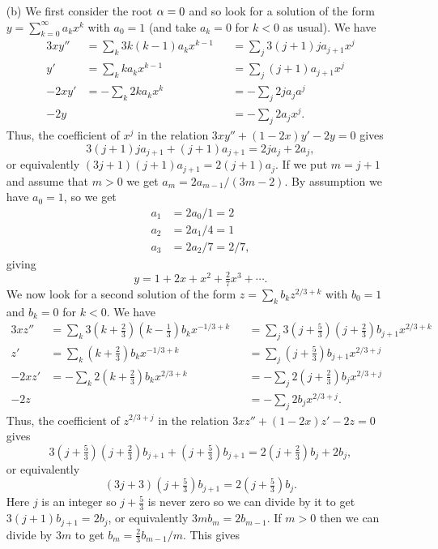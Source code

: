 \documentclass[a4paper]{amsart}
\begin{document}
\begin{solution}
\begin{itemize}
  \item[(b)]
   We first consider the root $\alpha=0$ and so look for a solution of the
   form $y=\sum_{k=0}^\infty a_kx^k$ with $a_0=1$ (and take $a_k=0$ for
   $k<0$ as usual).  We have
   \begin{align*}
    3xy'' &= \sum_k3k(k-1)a_kx^{k-1} 
          &&= \sum_j3(j+1)ja_{j+1}x^j \\
    y' &= \sum_k ka_kx^{k-1}
       &&= \sum_j (j+1)a_{j+1}x^j \\
    -2xy' &= - \sum_k 2ka_kx^k 
          &&= -\sum_j 2ja_ja^j \\
    -2y &&&= -\sum_j 2a_jx^j.
   \end{align*}
   Thus, the coefficient of $x^j$ in the relation $3xy''+(1-2x)y'-2y=0$
   gives 
   \[ 3(j+1)ja_{j+1} + (j+1)a_{j+1} = 2ja_j+2a_j, \]
   or equivalently $(3j+1)(j+1)a_{j+1}=2(j+1)a_j$.  If we put $m=j+1$
   and assume that $m>0$ we get $a_m=2a_{m-1}/(3m-2)$.  By assumption we
   have $a_0=1$, so we get
   \begin{align*}
    a_1 &= 2a_0/1 = 2 \\
    a_2 &= 2a_1/4 = 1 \\
    a_3 &= 2a_2/7 = 2/7,
   \end{align*}
   giving 
   \[ y = 1 + 2x + x^2 + \tfrac{2}{7}x^3 + \dotsb. \]
   We now look for a second solution of the form $z=\sum_kb_kz^{2/3+k}$
   with $b_0=1$ and $b_k=0$ for $k<0$.  We have
   \begin{align*}
    3xz'' &= \sum_k 3(k+\tfrac{2}{3})(k-\tfrac{1}{3})b_kx^{-1/3+k} 
         &&= \sum_j 3(j+\tfrac{5}{3})(j+\tfrac{2}{3})b_{j+1}x^{2/3+k} \\
    z'    &= \sum_k (k+\tfrac{2}{3})b_kx^{-1/3+k}
         &&= \sum_j (j+\tfrac{5}{3})b_{j+1}x^{2/3+j} \\
    -2xz' &= -\sum_k 2(k+\tfrac{2}{3})b_kx^{2/3+k}
         &&= -\sum_j 2(j+\tfrac{2}{3})b_jx^{2/3+j} \\
    -2z &&&= -\sum_j 2b_j x^{2/3+j}.
   \end{align*}
   Thus, the coefficient of $z^{2/3+j}$ in the relation
   $3xz''+(1-2x)z'-2z=0$ gives
   \[ 3(j+\tfrac{5}{3})(j+\tfrac{2}{3})b_{j+1} + 
      (j+\tfrac{5}{3})b_{j+1} = 
      2(j+\tfrac{2}{3})b_j + 2b_j,
   \]
   or equivalently 
   \[ (3j+3)(j+\tfrac{5}{3})b_{j+1} = 2(j+\tfrac{5}{3})b_j. \]
   Here $j$ is an integer so $j+\tfrac{5}{3}$ is never zero so we can
   divide by it to get $3(j+1)b_{j+1}=2b_j$, or equivalently
   $3mb_m=2b_{m-1}$.  If $m>0$ then we can divide by $3m$ to get
   $b_m=\frac{2}{3}b_{m-1}/m$.  This gives

\end{itemize}
\end{solution}
\end{document}
